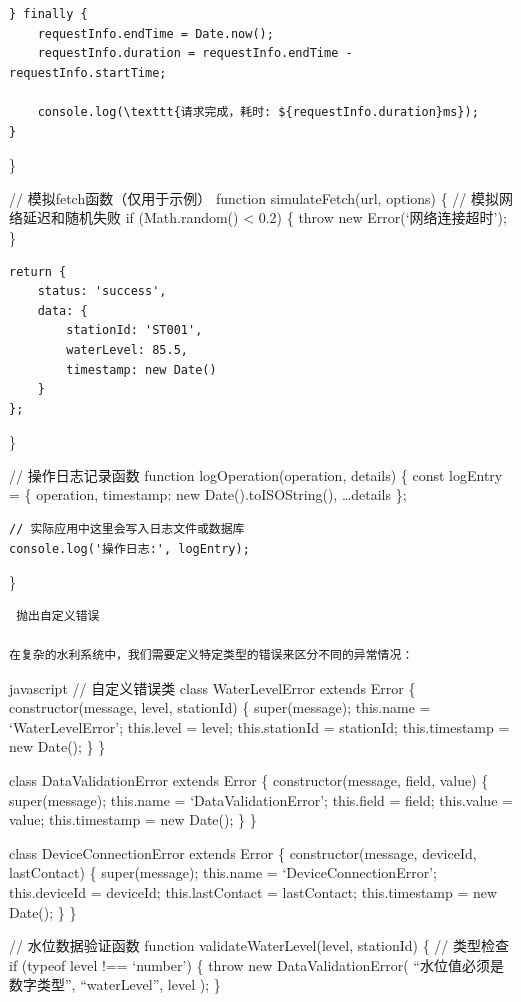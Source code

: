 {\begin{verbatim}
} finally {
    requestInfo.endTime = Date.now();
    requestInfo.duration = requestInfo.endTime - requestInfo.startTime;
    
    console.log(\texttt{请求完成，耗时: ${requestInfo.duration}ms});
}
\end{verbatim}

\}

// 模拟fetch函数（仅用于示例） function simulateFetch(url, options) \{ // 模拟网络延迟和随机失败 if (Math.random() \textless{} 0.2) \{ throw new Error(`网络连接超时'); \}

\begin{verbatim}
return {
    status: 'success',
    data: {
        stationId: 'ST001',
        waterLevel: 85.5,
        timestamp: new Date()
    }
};
\end{verbatim}

\}

// 操作日志记录函数 function logOperation(operation, details) \{ const logEntry = \{ operation, timestamp: new Date().toISOString(), \ldots details \};

\begin{verbatim}
// 实际应用中这里会写入日志文件或数据库
console.log('操作日志:', logEntry);
\end{verbatim}

\}

\begin{lstlisting}
 抛出自定义错误

在复杂的水利系统中，我们需要定义特定类型的错误来区分不同的异常情况：
\end{lstlisting}

javascript // 自定义错误类 class WaterLevelError extends Error \{ constructor(message, level, stationId) \{ super(message); this.name = `WaterLevelError'; this.level = level; this.stationId = stationId; this.timestamp = new Date(); \} \}

class DataValidationError extends Error \{ constructor(message, field, value) \{ super(message); this.name = `DataValidationError'; this.field = field; this.value = value; this.timestamp = new Date(); \} \}

class DeviceConnectionError extends Error \{ constructor(message, deviceId, lastContact) \{ super(message); this.name = `DeviceConnectionError'; this.deviceId = deviceId; this.lastContact = lastContact; this.timestamp = new Date(); \} \}

// 水位数据验证函数 function validateWaterLevel(level, stationId) \{ // 类型检查 if (typeof level !== `number') \{ throw new DataValidationError( ``水位值必须是数字类型'', ``waterLevel'', level ); \}

}
